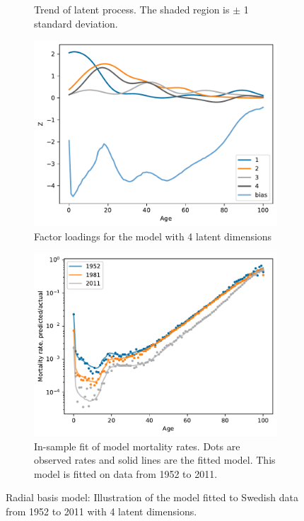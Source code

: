 \documentclass[11pt]{article}
\begin{document}
\begin{figure}
\begin{subfigure}[t]{0.45\textwidth}
        \caption{Trend of latent process. The shaded region is $\pm$ 1 standard deviation.}
    \end{subfigure}
    \hfill
    \begin{subfigure}[t]{0.45\textwidth}
        \centering
        \includegraphics[width=\textwidth]{figs/sweden_radial_basis_1952_2011_Male_100_15_4loadings.pdf}
        \caption{Factor loadings for the model with 4 latent dimensions}
        \label{fig:radial_loadings}
    \end{subfigure}
    \hfill
    \begin{subfigure}[t]{0.45\textwidth}
        \centering
        \includegraphics[width=\textwidth]{figs/sweden_radial_basis_1952_2011_Male_100_15_4rateVsAge.pdf}
        \caption{In-sample fit of model mortality rates. Dots are observed rates and solid lines are the fitted model. This model is fitted on data from 1952 to 2011.}
        \label{fig:radial_mortality_rates_in_sample_fit_sweden}
    \end{subfigure}
    \caption{Radial basis model: Illustration of the model fitted to Swedish data from 1952 to 2011 with 4 latent dimensions.}
    \label{fig:radial_model_illustration_sweden}
\end{figure}
\end{document}
